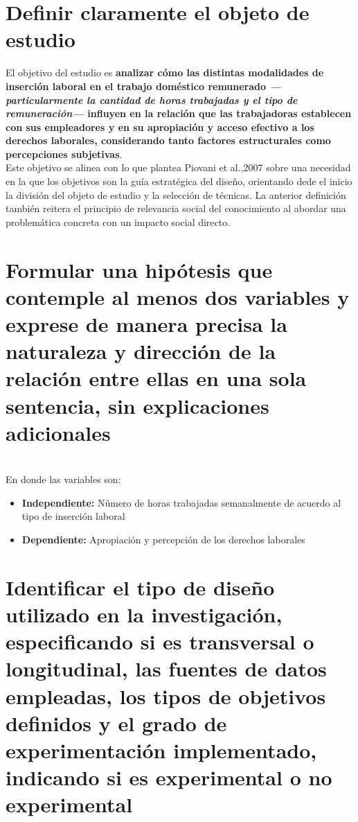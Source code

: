\documentclass{article}
\begin{document}
\section{Definir claramente el objeto de estudio} %

El objetivo del estudio es \textbf{analizar cómo las distintas modalidades de inserción laboral en el trabajo doméstico remunerado \textit{—particularmente la cantidad de horas trabajadas y el tipo de remuneración—} influyen en la relación que las trabajadoras establecen con sus empleadores y en su apropiación y acceso efectivo a los derechos laborales, considerando tanto factores estructurales como percepciones subjetivas}.\\

\noindent Este objetivo se alinea con lo que plantea Piovani et al.,2007 sobre una necesidad en la que los objetivos son la guía estratégica del diseño, orientando dede el inicio la división del objeto de estudio y la selección de técnicas. La anterior definición también reitera el principio de relevancia social del conocimiento al abordar una problemática concreta con un impacto social directo.

\section{Formular una hipótesis que contemple al menos dos variables y exprese de manera precisa la naturaleza y dirección de la relación entre ellas en una sola sentencia, sin explicaciones adicionales} %

\noindent{}\\

\noindent En donde las variables son:
\begin{itemize}
	\item \textbf{Independiente:} Número de horas trabajadas semanalmente de acuerdo al tipo de inserción laboral
	\item \textbf{Dependiente:} Apropiación y percepción de los derechos laborales
\end{itemize}

\section{Identificar el tipo de diseño utilizado en la investigación, especificando si es transversal o longitudinal, las fuentes de datos empleadas, los tipos de objetivos definidos y el grado de experimentación implementado, indicando si es experimental o no experimental}
\end{document}

